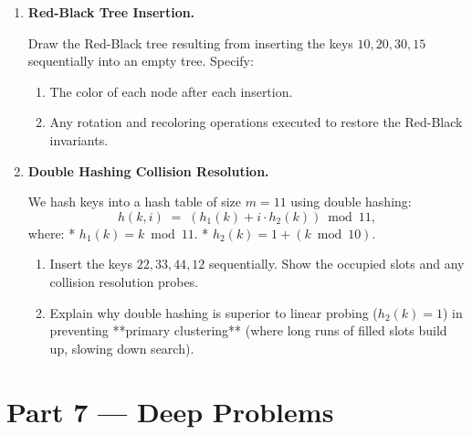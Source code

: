 \documentclass[12pt, a4paper]{book}
\begin{document}
\begin{problembox}
\begin{enumerate}[label=\textbf{P\arabic*.}]
  \item \textbf{Red-Black Tree Insertion.}
  
        Draw the Red-Black tree resulting from inserting the keys $10, 20, 30, 15$ sequentially into an empty tree.
        Specify:
        \begin{enumerate}[label=(\alph*)]
          \item The color of each node after each insertion.
          \item Any rotation and recoloring operations executed to restore the Red-Black invariants.
        \end{enumerate}

  \item \textbf{Double Hashing Collision Resolution.}
  
        We hash keys into a hash table of size $m = 11$ using double hashing:
        \[
          h(k, i) \;=\; \left( h_1(k) + i \cdot h_2(k) \right) \bmod 11,
        \]
        where:
        * $h_1(k) = k \bmod 11$.
        * $h_2(k) = 1 + (k \bmod 10)$.
        \begin{enumerate}[label=(\alph*)]
          \item Insert the keys $22, 33, 44, 12$ sequentially. Show the occupied slots and any collision resolution probes.
          \item Explain why double hashing is superior to linear probing ($h_2(k) = 1$) in preventing **primary clustering** (where long runs of filled slots build up, slowing down search).
        \end{enumerate}
\end{enumerate}
\end{problembox}

\newpage

\section{Part 7 --- Deep Problems}
\end{document}
